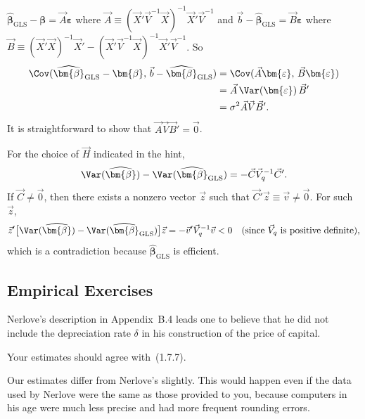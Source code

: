 \begin{answers}
\bigskip

 $\widehat{\bm{\beta}}_{\text{GLS}} - \bm{\beta} = \vec{A}\bm{\varepsilon}$
where $\vec{A} \equiv (\vec{X}'\vec{V}^{-1}\vec{X})^{-1}\vec{X}'\vec{V}^{-1}$
and $\vec{b} - \widehat{\bm{\beta}}_{\text{GLS}} = \vec{B}\bm{\varepsilon}$
where
$\vec{B} \equiv (\vec{X}'\vec{X})^{-1}\vec{X}'
- (\vec{X}'\vec{V}^{-1}\vec{X})^{-1}\vec{X}'\vec{V}^{-1}$.
So
%
\begin{align*}
\Cov(\widehat{\bm{\beta}}_{\text{GLS}} - \bm{\beta},\,
     \vec{b} - \widehat{\bm{\beta}}_{\text{GLS}})
&= \Cov(\vec{A}\bm{\varepsilon},\, \vec{B}\bm{\varepsilon}) \\
&= \vec{A}\,\Var(\bm{\varepsilon})\,\vec{B}' \\
&= \sigma^2 \vec{A}\vec{V}\vec{B}'.
\end{align*}
%
It is straightforward to show that $\vec{A}\vec{V}\vec{B}' = \vec{0}$.

\bigskip

 For the choice of $\vec{H}$ indicated in the hint,
%
\[
\Var(\widehat{\bm{\beta}}) - \Var(\widehat{\bm{\beta}}_{\text{GLS}})
= -\vec{C}\vec{V}_q^{-1}\vec{C}'.
\]
%
If $\vec{C} \neq \vec{0}$, then there exists a nonzero vector $\vec{z}$
such that $\vec{C}'\vec{z} \equiv \vec{v} \neq \vec{0}$. For such $\vec{z}$,
%
\[
\vec{z}'\bigl[\Var(\widehat{\bm{\beta}})
- \Var(\widehat{\bm{\beta}}_{\text{GLS}})\bigr]\vec{z}
= -\vec{v}'\vec{V}_q^{-1}\vec{v} < 0
\quad \text{(since $\vec{V}_q$ is positive definite)},
\]
%
which is a contradiction because $\widehat{\bm{\beta}}_{\text{GLS}}$ is
efficient.

\bigskip

\subsection*{Empirical Exercises}

 Nerlove's description in Appendix~B.4 leads one to believe that
he did not include the depreciation rate $\delta$ in his construction of the
price of capital.

\medskip

 Your estimates should agree with~(1.7.7).

\medskip

 Our estimates differ from Nerlove's slightly. This would happen
even if the data used by Nerlove were the same as those provided to you,
because computers in his age were much less precise and had more frequent
rounding errors.


\end{answers}
